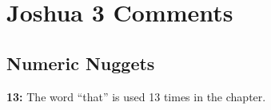 \section{Joshua 3 Comments}

\subsection{Numeric Nuggets}
\textbf{13: } The word ``that'' is used 13 times in the chapter.